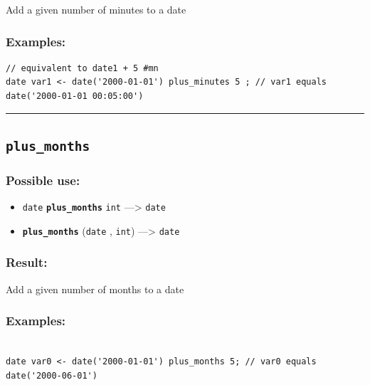 \documentclass[]{book}
\providecommand{\tightlist}{%
  \setlength{\itemsep}{0pt}\setlength{\parskip}{0pt}}
\theoremstyle{definition}
\theoremstyle{definition}
\theoremstyle{definition}
\theoremstyle{remark}
\begin{document}
Add a given number of minutes to a date

\subsubsection{Examples:}\label{examples-278}

\begin{verbatim}
// equivalent to date1 + 5 #mn  
date var1 <- date('2000-01-01') plus_minutes 5 ; // var1 equals date('2000-01-01 00:05:00')
\end{verbatim}

\begin{center}\rule{0.5\linewidth}{\linethickness}\end{center}

\subsection{\texorpdfstring{\texttt{plus\_months}}{plus\_months}}\label{plus_months}

\subsubsection{Possible use:}\label{possible-use-404}

\begin{itemize}
\tightlist
\item
  \texttt{date} \textbf{\texttt{plus\_months}} \texttt{int}
  ---\textgreater{} \texttt{date}
\item
  \textbf{\texttt{plus\_months}} (\texttt{date} , \texttt{int})
  ---\textgreater{} \texttt{date}
\end{itemize}

\subsubsection{Result:}\label{result-390}

Add a given number of months to a date

\subsubsection{Examples:}\label{examples-279}

\begin{verbatim}
 
date var0 <- date('2000-01-01') plus_months 5; // var0 equals date('2000-06-01')
\end{verbatim}
\end{document}
